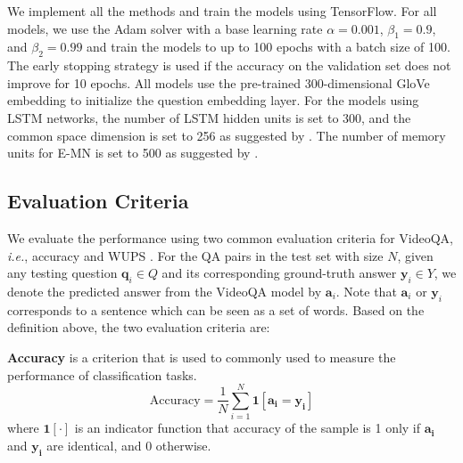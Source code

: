 \documentclass[letterpaper]{article} \usepackage{aaai19}  \usepackage{times}  \usepackage{helvet}  \usepackage{courier}  \usepackage{url}  \usepackage{graphicx}  \usepackage{amsfonts}
\begin{document}
We implement all the methods and train the models using TensorFlow. For all models, we use the Adam solver with a base learning rate $\alpha=0.001$, $\beta_1=0.9$, and $\beta_2=0.99$ and train the models to up to 100 epochs with a batch size of 100. The early stopping strategy is used if the accuracy on the validation set does not improve for 10 epochs. All models use the pre-trained 300-dimensional GloVe embedding \cite{pennington2014glove} to initialize the question embedding layer. For the models using LSTM networks, the number of LSTM hidden units is set to 300, and the common space dimension is set to 256 as suggested by \cite{xu2017video}. The number of memory units for E-MN is set to 500 as suggested by \cite{zeng2017leveraging}.


\subsection{Evaluation Criteria}
We evaluate the performance using two common evaluation criteria for VideoQA, \emph{i.e.}, accuracy \cite{xu2017video} and WUPS \cite{malinowski2014multi}. For the QA pairs in the test set with size $N$, given any testing question $\mathbf{q}_i\in Q$ and its corresponding ground-truth answer $\mathbf{y}_i\in Y$, we denote the predicted answer from the VideoQA model by $\mathbf{a}_i$. Note that $\mathbf{a}_i$ or $\mathbf{y}_i$ corresponds to a sentence which can be seen as a set of words. Based on the definition above, the two evaluation criteria are:

\textbf{Accuracy} is a criterion that is used to commonly used to measure the performance of classification tasks.
\begin{equation}
\textrm{Accuracy} = \frac{1}{N}\sum\limits_{i=1}^N \mathbf{1}[\mathbf{a_i}= \mathbf{y_i}]
\end{equation}
where $\mathbf{1}[\cdot]$ is an indicator function that accuracy of the sample is 1 only if $\mathbf{a_i}$ and $\mathbf{y_i}$ are identical, and 0 otherwise.
\end{document}
